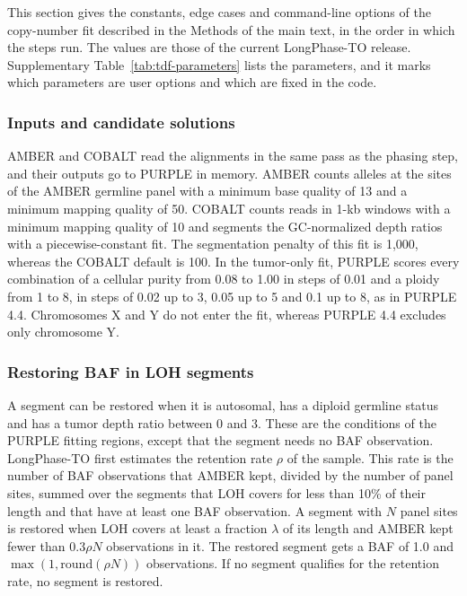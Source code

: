 \documentclass[pdflatex,sn-nature]{sn-jnl}
\begin{document}
This section gives the constants, edge cases and command-line options of the copy-number fit described in the Methods of the main text, in the order in which the steps run. The values are those of the current LongPhase-TO release. Supplementary Table~\ref{tab:tdf-parameters} lists the parameters, and it marks which parameters are user options and which are fixed in the code.

\subsubsection{Inputs and candidate solutions}

AMBER and COBALT read the alignments in the same pass as the phasing step, and their outputs go to PURPLE in memory. AMBER counts alleles at the sites of the AMBER germline panel with a minimum base quality of 13 and a minimum mapping quality of 50. COBALT counts reads in 1-kb windows with a minimum mapping quality of 10 and segments the GC-normalized depth ratios with a piecewise-constant fit. The segmentation penalty of this fit is 1,000, whereas the COBALT default is 100. In the tumor-only fit, PURPLE scores every combination of a cellular purity from 0.08 to 1.00 in steps of 0.01 and a ploidy from 1 to 8, in steps of 0.02 up to 3, 0.05 up to 5 and 0.1 up to 8, as in PURPLE 4.4. Chromosomes X and Y do not enter the fit, whereas PURPLE 4.4 excludes only chromosome Y.

\subsubsection{Restoring BAF in LOH segments}

A segment can be restored when it is autosomal, has a diploid germline status and has a tumor depth ratio between 0 and 3. These are the conditions of the PURPLE fitting regions, except that the segment needs no BAF observation. LongPhase-TO first estimates the retention rate $\rho$ of the sample. This rate is the number of BAF observations that AMBER kept, divided by the number of panel sites, summed over the segments that LOH covers for less than 10\% of their length and that have at least one BAF observation. A segment with $N$ panel sites is restored when LOH covers at least a fraction $\lambda$ of its length and AMBER kept fewer than $0.3\rho N$ observations in it. The restored segment gets a BAF of 1.0 and $\max(1, \mathrm{round}(\rho N))$ observations. If no segment qualifies for the retention rate, no segment is restored.
\end{document}

